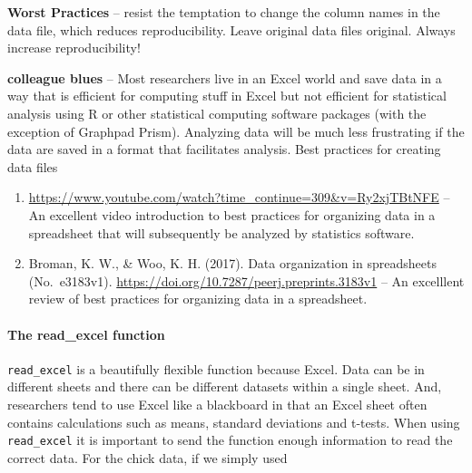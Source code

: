 \documentclass[]{book}
\newenvironment{Shaded}{\begin{snugshade}}{\end{snugshade}}
\newcommand{\KeywordTok}[1]{\textcolor[rgb]{0.13,0.29,0.53}{\textbf{#1}}}
\newcommand{\NormalTok}[1]{#1}
\newcommand{\OperatorTok}[1]{\textcolor[rgb]{0.81,0.36,0.00}{\textbf{#1}}}
\newcommand{\StringTok}[1]{\textcolor[rgb]{0.31,0.60,0.02}{#1}}
\let\oldparagraph\paragraph
\renewcommand{\paragraph}[1]{\oldparagraph{#1}\mbox{}}
\begin{document}
\textbf{Worst Practices} -- resist the temptation to change the column names in the data file, which reduces reproducibility. Leave original data files original. Always increase reproducibility!

\textbf{colleague blues} -- Most researchers live in an Excel world and save data in a way that is efficient for computing stuff in Excel but not efficient for statistical analysis using R or other statistical computing software packages (with the exception of Graphpad Prism). Analyzing data will be much less frustrating if the data are saved in a format that facilitates analysis. Best practices for creating data files

\begin{enumerate}
\def\labelenumi{\arabic{enumi}.}
\item
  \url{https://www.youtube.com/watch?time_continue=309\&v=Ry2xjTBtNFE} -- An excellent video introduction to best practices for organizing data in a spreadsheet that will subsequently be analyzed by statistics software.
\item
  Broman, K. W., \& Woo, K. H. (2017). Data organization in spreadsheets (No.~e3183v1). \url{https://doi.org/10.7287/peerj.preprints.3183v1} -- An excelllent review of best practices for organizing data in a spreadsheet.
\end{enumerate}

\hypertarget{the-read_excel-function}{%
\paragraph{The read\_excel function}\label{the-read_excel-function}}

\texttt{read\_excel} is a beautifully flexible function because Excel. Data can be in different sheets and there can be different datasets within a single sheet. And, researchers tend to use Excel like a blackboard in that an Excel sheet often contains calculations such as means, standard deviations and t-tests. When using \texttt{read\_excel} it is important to send the function enough information to read the correct data. For the chick data, if we simply used

\begin{Shaded}
\end{Shaded}
\end{document}
